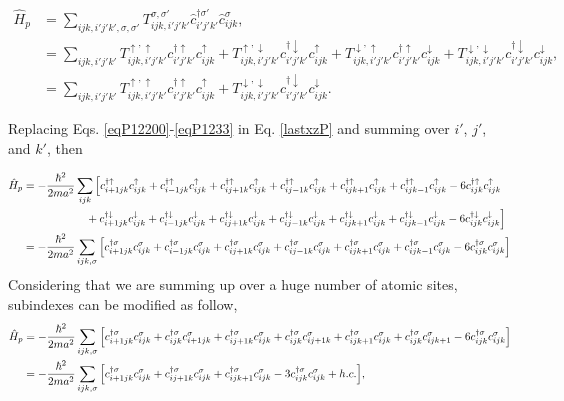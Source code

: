 \documentclass[10pt,prb,showpacs,amssymb,floatfix]{revtex4-1}
\newcommand{\nn}{\nonumber}
\newcommand{\sg}{\sigma}
\begin{document}
\begin{align}
\hat H_{p} &= \sum_{ijk,i'j'k',\sigma,\sigma'} T_{ijk,i'j'k'}^{\sigma,\sigma'} \hat{c}_{i'j'k'}^{\dagger \sigma'} \hat{c}_{ijk}^\sigma, \nn\\
&= \sum_{ijk,i'j'k'} T_{ijk,i'j'k'}^{\uparrow,\uparrow} c_{i'j'k'}^{\dagger \uparrow} c_{ijk}^\uparrow +  T_{ijk,i'j'k'}^{\uparrow,\downarrow} c_{i'j'k'}^{\dagger \downarrow} c_{ijk}^\uparrow + T_{ijk,i'j'k'}^{\downarrow,\uparrow} c_{i'j'k'}^{\dagger \uparrow} c_{ijk}^\downarrow + T_{ijk,i'j'k'}^{\downarrow,\downarrow} c_{i'j'k'}^{\dagger \downarrow} c_{ijk}^\downarrow, \nn\\
&= \sum_{ijk,i'j'k'} T_{ijk,i'j'k'}^{\uparrow,\uparrow} c_{i'j'k'}^{\dagger \uparrow} c_{ijk}^\uparrow  + T_{ijk,i'j'k'}^{\downarrow,\downarrow} c_{i'j'k'}^{\dagger \downarrow} c_{ijk}^\downarrow.
\label{lastxzP}
\end{align}

Replacing  Eqs. \eqref{eqP12200}-\eqref{eqP1233} in Eq. \eqref{lastxzP} and summing over $i'$, $j'$, and $k'$, then

\begin{align}
\hat H_{p} &= -\frac{\hbar^2}{2ma^2} \sum_{ijk}  \Big{[} c_{i+1jk}^{\dagger \uparrow} c_{ijk}^\uparrow + c_{i-1jk}^{\dagger \uparrow} c_{ijk}^\uparrow   + c_{ij+1k}^{\dagger \uparrow} c_{ijk}^\uparrow +c_{ij-1k}^{\dagger \uparrow} c_{ijk}^\uparrow   + c_{ijk+1}^{\dagger \uparrow} c_{ijk}^\uparrow + c_{ijk-1}^{\dagger \uparrow} c_{ijk}^\uparrow  -6 c_{ijk}^{\dagger \uparrow} c_{ijk}^\uparrow \nn\\
& ~~~~~~~~~~~~~~~~~+ c_{i+1jk}^{\dagger \downarrow} c_{ijk}^\downarrow + c_{i-1jk}^{\dagger \downarrow} c_{ijk}^\downarrow   + c_{ij+1k}^{\dagger \downarrow} c_{ijk}^\downarrow +c_{ij-1k}^{\dagger \downarrow} c_{ijk}^\downarrow   + c_{ijk+1}^{\dagger \downarrow} c_{ijk}^\downarrow + c_{ijk-1}^{\dagger \downarrow} c_{ijk}^\downarrow  -6 c_{ijk}^{\dagger \downarrow} c_{ijk}^\downarrow\Big{]} \\ 
&=  -\frac{\hbar^2}{2ma^2} \sum_{ijk,\sg}  \Big{[} c_{i+1jk}^{\dagger \sg} c_{ijk}^\sg + c_{i-1jk}^{\dagger \sg} c_{ijk}^\sg   + c_{ij+1k}^{\dagger \sg} c_{ijk}^\sg +c_{ij-1k}^{\dagger \sg} c_{ijk}^\sg   + c_{ijk+1}^{\dagger \sg} c_{ijk}^\sg + c_{ijk-1}^{\dagger \sg} c_{ijk}^\sg  -6 c_{ijk}^{\dagger \sg} c_{ijk}^\sg \Big{]} 
\end{align}
Considering that we are summing up over a huge number of atomic sites, subindexes can be modified as follow,
\begin{align}
\hat H_{p} &=  -\frac{\hbar^2}{2ma^2} \sum_{ijk,\sg}  \Big{[} c_{i+1jk}^{\dagger \sg} c_{ijk}^\sg + c_{ijk}^{\dagger \sg} c_{i+1jk}^\sg   + c_{ij+1k}^{\dagger \sg} c_{ijk}^\sg +c_{ijk}^{\dagger \sg} c_{ij+1k}^\sg   + c_{ijk+1}^{\dagger \sg} c_{ijk}^\sg + c_{ijk}^{\dagger \sg} c_{ijk+1}^\sg  -6 c_{ijk}^{\dagger \sg} c_{ijk}^\sg \Big{]} \nn\\
&=  -\frac{\hbar^2}{2ma^2} \sum_{ijk,\sg}  \Big{[} c_{i+1jk}^{\dagger \sg} c_{ijk}^\sg    + c_{ij+1k}^{\dagger \sg} c_{ijk}^\sg   + c_{ijk+1}^{\dagger \sg} c_{ijk}^\sg   -3 c_{ijk}^{\dagger \sg} c_{ijk}^\sg + h.c.  \Big{]},
\label{hpoperator}
\end{align}
\end{document}
